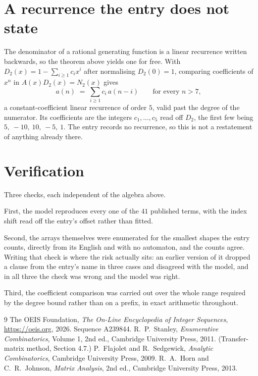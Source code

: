 \documentclass[11pt,a4paper]{article}
\theoremstyle{plain}
\theoremstyle{definition}
\begin{document}
\section{A recurrence the entry does not state}

The denominator of a rational generating function is a linear recurrence written backwards, so
the theorem above yields one for free. With $D_2(x)=1-\sum_{i\ge1}c_ix^i$ after normalising
$D_2(0)=1$, comparing coefficients of $x^n$ in $A(x)D_2(x)=N_2(x)$ gives
\[
a(n)\;=\;\sum_{i\ge1}c_i\,a(n-i)\qquad\text{for every }n>7,
\]
a constant-coefficient linear recurrence of order $5$, valid past the degree of the
numerator. Its coefficients are the integers $c_1,\dots,c_{5}$ read off $D_2$, the first few being $5,\ -10,\ 10,\ -5,\ 1$. The entry records no recurrence, so this is not a restatement of anything
already there.

\section{Verification}

Three checks, each independent of the algebra above.

First, the model reproduces every one of the $41$ published terms, with the index shift
read off the entry's offset rather than fitted.

Second, the arrays themselves were enumerated for the smallest shapes the entry counts,
directly from its English and with no automaton, and the counts agree. Writing that check is
where the risk actually sits: an earlier version of it dropped a clause from the entry's name
in three cases and disagreed with the model, and in all three the check was wrong and the model
was right.

Third, the coefficient comparison was carried out over the whole range required by the degree
bound rather than on a prefix, in exact arithmetic throughout.

\begin{thebibliography}{9}
 The OEIS Foundation, \emph{The On-Line Encyclopedia of Integer
Sequences}, \url{https://oeis.org}, 2026. Sequence A239844.
 R.~P.~Stanley, \emph{Enumerative Combinatorics}, Volume 1, 2nd ed.,
Cambridge University Press, 2011. (Transfer-matrix method, Section 4.7.)
 P.~Flajolet and R.~Sedgewick, \emph{Analytic Combinatorics}, Cambridge
University Press, 2009.
 R.~A.~Horn and C.~R.~Johnson, \emph{Matrix Analysis}, 2nd ed., Cambridge
University Press, 2013.
\end{thebibliography}
\end{document}
